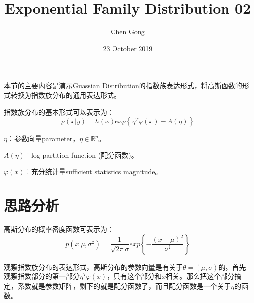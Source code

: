 \documentclass[a4paper]{article}
\title{Exponential Family Distribution 02}
\author{Chen Gong}
\date{23 October 2019}
\begin{document}
\maketitle

本节的主要内容是演示Guassian Distribution的指数族表达形式，将高斯函数的形式转换为指数族分布的通用表达形式。

指数族分布的基本形式可以表示为：
\begin{equation}
    p(x|y)=h(x)exp\left\{ \eta^T\varphi(x)-A(\eta) \right\}
\end{equation}

$\eta$：参数向量parameter，$\eta \in \mathbb{R}^p$。

$A(\eta)$：log partition function (配分函数)。

$\varphi(x)$：充分统计量sufficient statistics magnitude。

\section{思路分析}
高斯分布的概率密度函数可表示为：
\begin{equation}
    p(x|\mu,\sigma^2) = \frac{1}{\sqrt{2\pi}\sigma}exp\left\{ -\frac{(x-\mu)^2}{\sigma^2} \right\}
\end{equation}

观察指数族分布的表达形式，高斯分布的参数向量是有关于$\theta=(\mu,\sigma)$的。首先观察指数部分的第一部分$\eta^T\varphi(x)$，只有这个部分和$x$相关。那么把这个部分搞定，系数就是参数矩阵，剩下的就是配分函数了，而且配分函数是一个关于$\eta$的函数。
\end{document}

